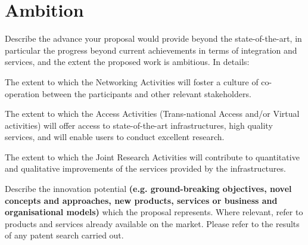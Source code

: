 

\section{Ambition}

\begin{todo}{}\color{red}
  Describe the advance your proposal would provide beyond the state-of-the-art, in particular the progress beyond current achievements in terms of integration and services, and the extent the proposed work is ambitious. In details:

  The extent to which the Networking Activities will foster a culture of co-operation between the participants and other relevant stakeholders.

  The extent to which the Access Activities (Trans-national Access and/or Virtual activities) will offer access to state-of-the-art infrastructures, high quality services, and will enable users to conduct excellent research.

  The extent to which the Joint Research Activities will contribute to quantitative and qualitative improvements of the services provided by the infrastructures.

  Describe the innovation potential {\bf (e.g. ground-breaking objectives, novel concepts and approaches, new products, services or business and organisational models)} which the proposal represents. Where relevant, refer to products and services already available on the market. Please refer to the results of any patent search carried out.
\end{todo}









